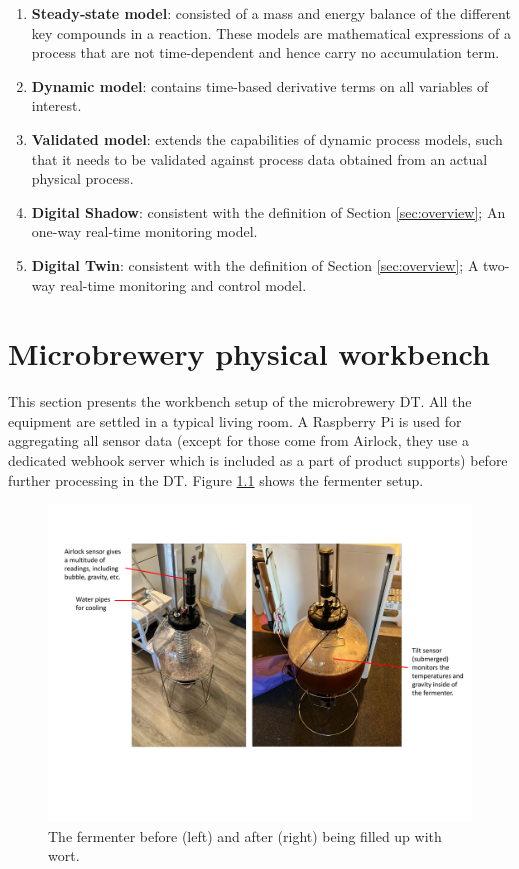 \begin{enumerate}
  \item \textbf{Steady‑state model}: consisted of a mass and energy balance of the different key compounds in a reaction. These models are mathematical expressions of a process
that are not time-dependent and hence carry no accumulation
term.
  \item \textbf{Dynamic model}: contains time-based derivative terms on all variables of interest.
  \item \textbf{Validated model}: extends the capabilities of dynamic process models, such that it needs to be validated against process data obtained from an actual physical process.
  \item \textbf{Digital Shadow}: consistent with the definition of Section \ref{sec:overview}; An one-way real-time monitoring model.
  \item \textbf{Digital Twin}: consistent with the definition of Section \ref{sec:overview}; A two-way real-time monitoring and control model.
\end{enumerate}

\chapter{Microbrewery physical workbench} \label{apd:workbench}
This section presents the workbench setup of the microbrewery DT. All the equipment are settled in a typical living room. A Raspberry Pi is used for aggregating all sensor data (except for those come from Airlock, they use a dedicated webhook server which is included as a part of product supports) before further processing in the DT. Figure \ref{fig:workbench_fermenter} shows the fermenter setup. 

\begin{figure}[hbt!]
  \centering
  \includegraphics[scale=0.65]{figures/workbench_fermenter.pdf}
  \caption{The fermenter before (left) and after (right) being filled up with wort.}
  \label{fig:workbench_fermenter}
\end{figure}

